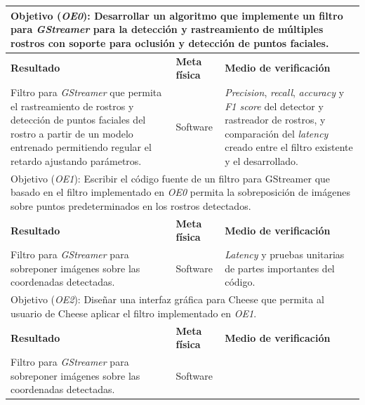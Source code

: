\documentclass[a4paper,openright,12pt]{report}
\begin{document}
\begin{center}
  \begin{longtable}{| p{.4\linewidth} | p{.2\linewidth} | p{.3\linewidth} |}
  \hline

  \multicolumn{3}{|p{\linewidth}|}{Objetivo (\textit{OE0}): Desarrollar un algoritmo que
  implemente un filtro para \textit{GStreamer} para la detección y rastreamiento
  de múltiples rostros con soporte para oclusión y detección de puntos faciales.}
  \\ \hline

  \textbf{Resultado} &
  \textbf{Meta física} &
  \textbf{Medio de verificación}
  \\ \hline

  Filtro para \textit{GStreamer} que permita el rastreamiento de rostros y
  detección de puntos faciales del rostro a partir de un modelo entrenado 
  permitiendo regular el retardo ajustando parámetros. &
  Software &
  \textit{Precision}, \textit{recall}, \textit{accuracy} y
  \textit{F1 score} del detector y rastreador de rostros, y comparación del
  \textit{latency} creado entre el filtro existente y el desarrollado.
  \\ \hline

  \multicolumn{3}{|p{\linewidth}|}{Objetivo (\textit{OE1}): Escribir el código
  fuente de un filtro para GStreamer que basado en el filtro implementado en
  \textit{OE0} permita la sobreposición de imágenes sobre puntos predeterminados
  en los rostros detectados.}
  \\ \hline

  \textbf{Resultado} &
  \textbf{Meta física} &
  \textbf{Medio de verificación}
  \\ \hline

  Filtro para \textit{GStreamer} para sobreponer imágenes sobre las coordenadas
  detectadas. &
  Software &
  \textit{Latency} y pruebas unitarias de partes importantes del código.
  \\ \hline

  \multicolumn{3}{|p{\linewidth}|}{Objetivo (\textit{OE2}): Diseñar una interfaz
  gráfica para Cheese que permita al usuario de Cheese aplicar el filtro
  implementado en \textit{OE1}.}
  \\ \hline

  \textbf{Resultado} &
  \textbf{Meta física} &
  \textbf{Medio de verificación}
  \\ \hline

  Filtro para \textit{GStreamer} para sobreponer imágenes sobre las coordenadas
  detectadas. &
  Software &
  \\ \hline
  \end{longtable}
\end{center}
\end{document}
